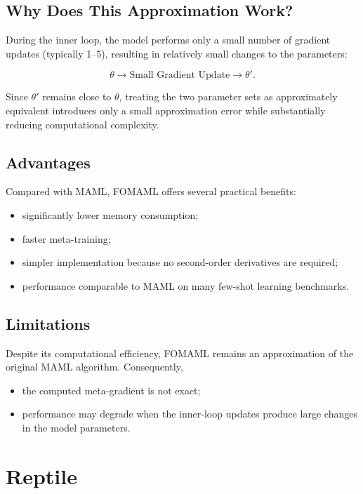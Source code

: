 \subsection*{Why Does This Approximation Work?}

During the inner loop, the model performs only a small number of gradient updates (typically 1--5), resulting in relatively small changes to the parameters:

\[
\theta
\longrightarrow
\text{Small Gradient Update}
\longrightarrow
\theta'.
\]

Since $\theta'$ remains close to $\theta$, treating the two parameter sets as approximately equivalent introduces only a small approximation error while substantially reducing computational complexity.

\subsection*{Advantages}

Compared with MAML, FOMAML offers several practical benefits:

\begin{itemize}
    \item significantly lower memory consumption;
    \item faster meta-training;
    \item simpler implementation because no second-order derivatives are required;
    \item performance comparable to MAML on many few-shot learning benchmarks.
\end{itemize}

\subsection*{Limitations}

Despite its computational efficiency, FOMAML remains an approximation of the original MAML algorithm. Consequently,

\begin{itemize}
    \item the computed meta-gradient is not exact;
    \item performance may degrade when the inner-loop updates produce large changes in the model parameters.
\end{itemize}
\section{Reptile}

